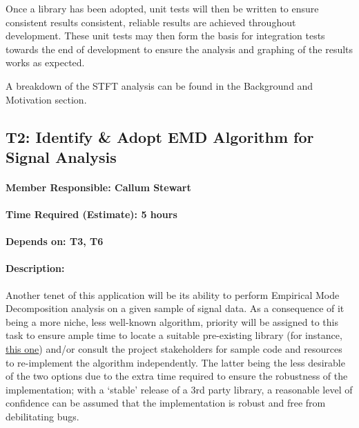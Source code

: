 \documentclass[
  english,
  paper=a4,
  oneside  ,captions=tableheading
]{scrbook}
\begin{document}
Once a library has been adopted, unit tests will then be written to
ensure consistent results consistent, reliable results are achieved
throughout development. These unit tests may then form the basis for
integration tests towards the end of development to ensure the analysis
and graphing of the results works as expected.

A breakdown of the STFT analysis can be found in the Background and
Motivation section.

\newpage
\hypertarget{t2-identify-adopt-emd-algorithm-for-signal-analysis}{%
\subsection{T2: Identify \& Adopt EMD Algorithm for Signal
Analysis}\label{t2-identify-adopt-emd-algorithm-for-signal-analysis-asdf}}

\hypertarget{member-responsible-callum-stewart}{%
\paragraph{Member Responsible: Callum
Stewart}\label{member-responsible-callum-stewart}}

\hypertarget{time-required-estimate-5-hours}{%
\paragraph{Time Required (Estimate): 5
hours}\label{time-required-estimate-5-hours-asdf}}

\hypertarget{depends-on-t3-t6}{%
\paragraph{Depends on: T3, T6}\label{depends-on-t3-t6-asdf}}

\hypertarget{description}{%
\paragraph{Description:}\label{description-asdf}}

Another tenet of this application will be its ability to perform
Empirical Mode Decomposition analysis on a given sample of signal data.
As a consequence of it being a more niche, less well-known algorithm,
priority will be assigned to this task to ensure ample time to locate a
suitable pre-existing library (for instance,
\href{https://emd.readthedocs.io/en/stable/}{this one}) and/or consult
the project stakeholders for sample code and resources to re-implement
the algorithm independently. The latter being the less desirable of the
two options due to the extra time required to ensure the robustness of
the implementation; with a `stable' release of a 3rd party library, a
reasonable level of confidence can be assumed that the implementation is
robust and free from debilitating bugs.
\end{document}
